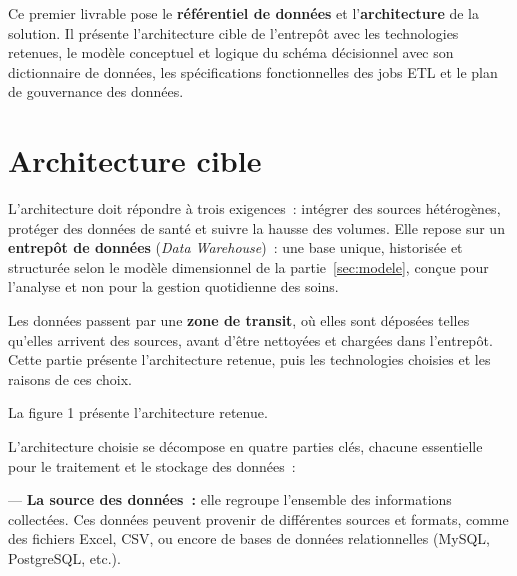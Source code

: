 \noindent Ce premier livrable pose le \textbf{référentiel de données} et l'\textbf{architecture} de la solution. Il présente l'architecture cible de l'entrepôt avec les technologies retenues, le modèle conceptuel et logique du schéma décisionnel avec son dictionnaire de données, les spécifications fonctionnelles des jobs ETL et le plan de gouvernance des données.

\newpage
\section{Architecture cible}\label{sec:architecture}

\noindent L'architecture doit répondre à trois exigences~: intégrer des sources hétérogènes, protéger des données de santé et suivre la hausse des volumes. Elle repose sur un \textbf{entrepôt de données} (\textit{Data Warehouse})~: une base unique, historisée et structurée selon le modèle dimensionnel de la partie~\ref{sec:modele}, conçue pour l'analyse et non pour la gestion quotidienne des soins.

\vspace{0.2cm}

\noindent Les données passent par une \textbf{zone de transit}, où elles sont déposées telles qu'elles arrivent des sources, avant d'être nettoyées et chargées dans l'entrepôt. Cette partie présente l'architecture retenue, puis les technologies choisies et les raisons de ces choix.

\vspace{0.2cm}

\noindent La figure 1 présente l'architecture retenue.

\begin{center}
\resizebox{0.8\textwidth}{!}{}
\end{center}

\noindent L’architecture choisie se décompose en quatre parties clés, chacune essentielle pour le traitement et le stockage des données~:

\vspace{0.2cm}

\noindent — \textbf{La source des données~:} elle regroupe l’ensemble des informations collectées. Ces données peuvent provenir de différentes sources et formats, comme des fichiers Excel, CSV, ou encore de bases de données relationnelles (MySQL, PostgreSQL, etc.).

